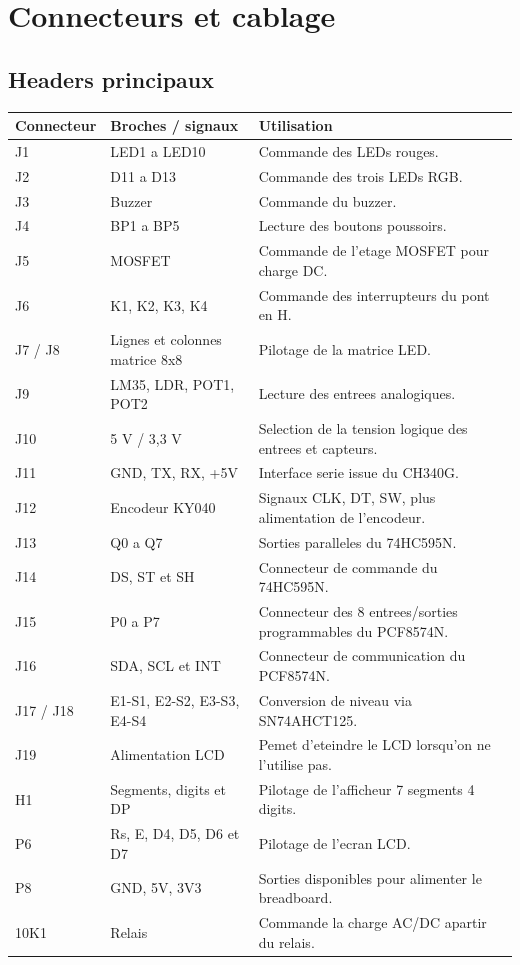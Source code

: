 \documentclass[11pt,a4paper]{article}
\begin{document}
\section{Connecteurs et cablage}
\subsection{Headers principaux}
{\small
\begin{tabularx}{\textwidth}{@{}L{2.2cm}L{4.5cm}Y@{}}
\toprule
{}
\textbf{Connecteur} & \textbf{Broches / signaux} & \textbf{Utilisation} \\
\midrule
J1 & LED1 a LED10 & Commande des LEDs rouges. \\
J2 & D11 a D13 & Commande des trois LEDs RGB. \\
J3 & Buzzer & Commande du buzzer. \\
J4 & BP1 a BP5 & Lecture des boutons poussoirs. \\
J5 & MOSFET & Commande de l'etage MOSFET pour charge DC. \\
J6 & K1, K2, K3, K4 & Commande des interrupteurs du pont en H. \\
J7 / J8 & Lignes et colonnes matrice 8x8 & Pilotage de la matrice LED. \\
J9 & LM35, LDR, POT1, POT2 & Lecture des entrees analogiques. \\
J10 & 5 V / 3,3 V & Selection de la tension logique des entrees et capteurs. \\
J11 & GND, TX, RX, +5V & Interface serie issue du CH340G. \\
J12 & Encodeur KY040 & Signaux CLK, DT, SW, plus alimentation de l'encodeur. \\
J13 & Q0 a Q7 & Sorties paralleles du 74HC595N. \\
J14 & DS, ST et SH & Connecteur de commande du 74HC595N. \\
J15 & P0 a P7 & Connecteur des 8 entrees/sorties programmables du PCF8574N. \\
J16 & SDA, SCL et INT & Connecteur de communication du PCF8574N. \\
J17 / J18 & E1-S1, E2-S2, E3-S3, E4-S4 & Conversion de niveau via SN74AHCT125. \\
J19 & Alimentation LCD & Pemet d'eteindre le LCD lorsqu'on ne l'utilise pas. \\
H1 & Segments, digits et DP & Pilotage de l'afficheur 7 segments 4 digits. \\
P6 & Rs, E, D4, D5, D6 et D7 & Pilotage de l'ecran LCD. \\
P8 & GND, 5V, 3V3 & Sorties disponibles pour alimenter le breadboard. \\
10K1 & Relais & Commande la charge AC/DC apartir du relais. \\
\bottomrule
\end{tabularx}}
\end{document}
